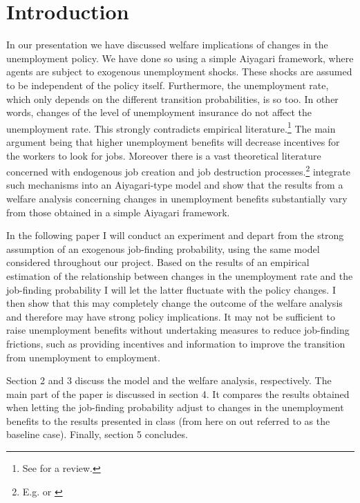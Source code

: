 \documentclass[a4paper,11pt]{article}
\begin{document}


\setcounter{page}{1}        %
\pagebreak


\section{Introduction}

In our presentation we have discussed welfare implications of changes in the unemployment policy. We have done so using a simple Aiyagari framework, where agents are subject to exogenous unemployment shocks. These shocks are assumed to be independent of the policy itself. Furthermore, the unemployment rate, which only depends on the different transition probabilities, is so too. In other words, changes of the level of unemployment insurance do not affect the unemployment rate. This strongly contradicts empirical literature.\footnote{See \citep{decker} for a review.} The main argument being that higher unemployment benefits will decrease incentives for the workers to look for jobs. Moreover there is a vast theoretical literature concerned with endogenous job creation and job destruction processes.\footnote{E.g. \cite{diamond1981mobility} or \cite{mortensen1994job}} \cite{KrusellMukoyamaSahin} integrate such mechanisms into an Aiyagari-type model and show that the results from a welfare analysis concerning changes in unemployment benefits substantially vary from those obtained in a simple Aiyagari framework. 

In the following paper I will conduct an experiment and depart from the strong assumption of an exogenous job-finding probability, using the same model considered throughout our project. Based on the results of an empirical estimation of the relationship between changes in the unemployment rate and the job-finding probability I will let the latter fluctuate with the policy changes. I then show that this may completely change the outcome of the welfare analysis and therefore may have strong policy implications. It may not be sufficient to raise unemployment benefits without undertaking measures to reduce job-finding frictions, such as providing incentives and information to improve the transition from unemployment to employment.

Section 2 and 3 discuss the model and the welfare analysis, respectively. The main part of the paper is discussed in section 4. It compares the results obtained when letting the job-finding probability adjust to changes in the unemployment benefits to the results presented in class (from here on out referred to as the baseline case). Finally, section 5 concludes. 
\end{document}
